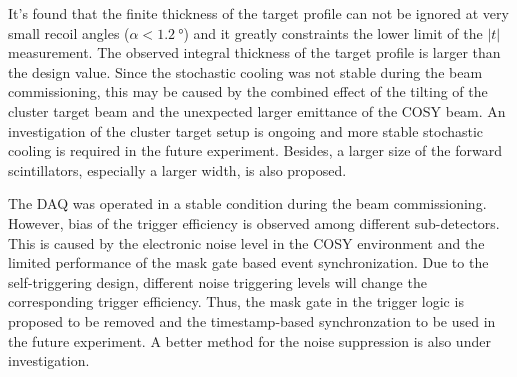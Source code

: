 \documentclass[number,5p]{elsarticle}
\begin{document}
It's found that the finite thickness of the target profile can not be ignored at
very small recoil angles ($\alpha < \SI{1.2}{\degree}$) and it greatly
constraints the lower limit of the $|t|$ measurement.
The observed integral thickness of the target profile is larger than the design value.
Since the stochastic cooling was not stable during the beam commissioning, this may be caused by the combined effect of the tilting of the cluster target
beam and the unexpected larger emittance of the COSY beam.
An investigation of the cluster target setup is ongoing and more stable stochastic cooling is required in the future experiment.
Besides, a larger size of the forward scintillators, especially a larger width, is also proposed.

The DAQ was operated in a stable condition during the beam commissioning.
However, bias of the trigger efficiency is observed among different sub-detectors.
This is caused by the electronic noise level in the COSY environment
and the limited performance of the mask gate based event synchronization.
Due to the self-triggering design, different noise triggering levels will change the corresponding trigger efficiency.
Thus, the mask gate in the trigger logic is proposed to be removed and the timestamp-based synchronzation to be used in the future experiment.
A better method for the noise suppression is also under investigation.



\end{document}
